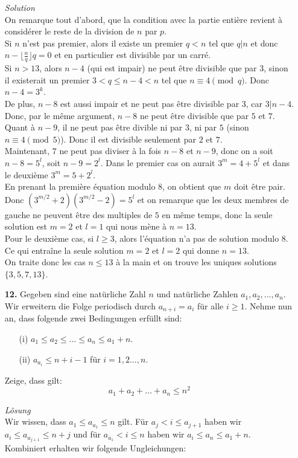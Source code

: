 \documentclass[12pt,a4paper]{article}
\theoremstyle{plain}
\theoremstyle{definition}
\theoremstyle{remark}
\begin{document}
\begin{enumerate}
\textit{Solution}\\
On remarque tout d'abord, que la condition avec la partie entière revient à considérer le reste de la division de $n$ par $p$.\\
Si $n$ n'est pas premier, alors il existe un premier $q<n$ tel que $q|n$ et donc $n-\lfloor \frac{n}{q}\rfloor q = 0$ et en particulier est divisible par un carré.\\
Si $n>13$, alors $n-4$ (qui est impair) ne peut être divisible que par $3$, sinon il existerait un premier $3<q\leq n-4<n$ tel que $n \equiv 4 \pmod q$. Donc $n-4=3^k$.\\
De plus, $n-8$ est aussi impair et ne peut pas être divisible par $3$, car $3|n-4$. Donc, par le même argument, $n-8$ ne peut être divisible que par $5$ et $7$.\\
Quant à $n-9$, il ne peut pas être divible ni par $3$, ni par $5$ (sinon $n \equiv 4 \pmod 5$). Donc il est divisible seulement par $2$ et $7$.\\
Maintenant, $7$ ne peut pas diviser à la fois $n-8$ et $n-9$, donc on a soit $n-8=5^l$, soit $n-9=2^l$. Dans le premier cas on aurait $3^m=4+5^l$ et dans le deuxième $3^m=5+2^l$.\\
En prenant la première équation modulo $8$, on obtient que $m$ doit être pair. Donc $(3^{m/2}+2)(3^{m/2}-2)=5^l$ et on remarque que les deux membres de gauche ne peuvent être des multiples de $5$ en même temps, donc la seule solution est $m=2$ et $l=1$ qui nous mène à $n=13$.\\
Pour le deuxième cas, si $l\geq 3$, alors l'équation n'a pas de solution modulo $8$. Ce qui entraîne la seule solution $m=2$ et $l=2$ qui donne $n=13$.\\
On traite donc les cas $n\leq 13$ à la main et on trouve les uniques solutions $\{ 3,5,7,13 \}$.

\item[\textbf{12.}]
Gegeben sind eine natürliche Zahl $n$ und natürliche Zahlen $a_1,a_2, \dots,a_n$. Wir erweitern die Folge periodisch durch $a_{n+i} = a_i$ für alle $i\geq 1$. Nehme nun an, dass folgende zwei Bedingungen erfüllt sind:
\begin{enumerate}
    \item[(i)] $a_1\leq a_2\leq\dots \leq a_n\leq a_1 +n$.
    \item[(ii)] $a_{a_i} \leq n+i-1$ für $i=1,2\dots,n$.
\end{enumerate}
Zeige, dass gilt:
\[
a_1+a_2+\dots +a_n \leq n^2
\]

\textit{Lösung}\\
Wir wissen, dass $a_1 \le a_{a_1} \le n$ gilt. Für $a_j < i \le a_{j+1}$ haben wir $a_i \le a_{a_{j+1}} \le n+j$ und für $a_{a_1} < i \le n$ haben wir $a_i \le a_n \le a_1+n$.\\
Kombiniert erhalten wir folgende Ungleichungen:


\end{enumerate}
\end{document}
